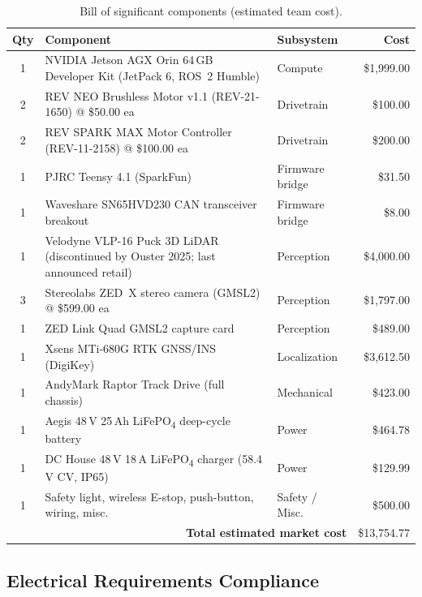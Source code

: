 \documentclass[12pt, letterpaper]{article}
\begin{document}
\begin{table}[H]
    \centering
    \footnotesize
    \caption{Bill of significant components (estimated team cost).}
    \begin{tabularx}{\textwidth}{c X l r}
        \toprule
        \textbf{Qty} & \textbf{Component} & \textbf{Subsystem} & \textbf{Cost} \\
        \midrule
        1 & NVIDIA Jetson AGX Orin 64\,GB Developer Kit (JetPack 6, ROS~2 Humble) & Compute & \$1{,}999.00 \\
        2 & REV NEO Brushless Motor v1.1 (REV-21-1650) @ \$50.00 ea & Drivetrain & \$100.00 \\
        2 & REV SPARK MAX Motor Controller (REV-11-2158) @ \$100.00 ea & Drivetrain & \$200.00 \\
        1 & PJRC Teensy 4.1 (SparkFun) & Firmware bridge & \$31.50 \\
        1 & Waveshare SN65HVD230 CAN transceiver breakout & Firmware bridge & \$8.00 \\
        1 & Velodyne VLP-16 Puck 3D LiDAR (discontinued by Ouster 2025; last announced retail) & Perception & \$4{,}000.00 \\
        3 & Stereolabs ZED~X stereo camera (GMSL2) @ \$599.00 ea & Perception & \$1{,}797.00 \\
        1 & ZED Link Quad GMSL2 capture card & Perception & \$489.00 \\
        1 & Xsens MTi-680G RTK GNSS/INS (DigiKey) & Localization & \$3{,}612.50 \\
        1 & AndyMark Raptor Track Drive (full chassis) & Mechanical & \$423.00 \\
        1 & Aegis 48\,V 25\,Ah LiFePO\textsubscript{4} deep-cycle battery & Power & \$464.78 \\
        1 & DC House 48\,V 18\,A LiFePO\textsubscript{4} charger (58.4\,V CV, IP65) & Power & \$129.99 \\
        1 & Safety light, wireless E-stop, push-button, wiring, misc.\ & Safety / Misc.\ & \$500.00 \\
        \midrule
        \multicolumn{3}{r}{\textbf{Total estimated market cost}} & \$13{,}754.77 \\
        \bottomrule
    \end{tabularx}
\end{table}

\subsection{Electrical Requirements Compliance}
\end{document}
